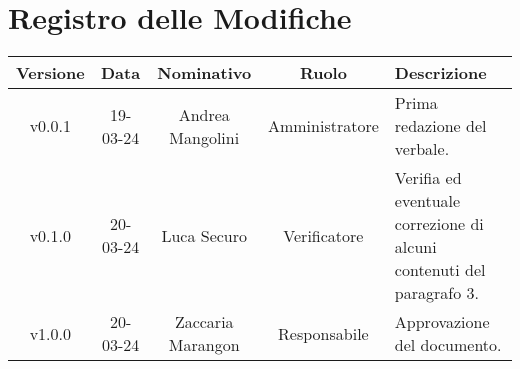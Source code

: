 \section*{\Large Registro delle Modifiche}
    \begin{table}[h]
        \centering
        \renewcommand\tabularxcolumn[1]{m{#1}} %
        \renewcommand{\arraystretch}{1.5}
        \begin{tabularx}{0.98\textwidth}
            {c|c|c|c|>{\centering\arraybackslash}X}
            \rowcolor{black}
            \textbf{\color{white} Versione} & \textbf{\color{white} Data} & \textbf{\color{white} Nominativo} & \textbf{\color{white} Ruolo} & \textbf{\color{white} Descrizione} \\ 
            \hline

            v0.0.1 & 19-03-24 & Andrea Mangolini & Amministratore & Prima redazione del verbale.\\
            v0.1.0 & 20-03-24 & Luca Securo & Verificatore & Verifia ed eventuale correzione di alcuni contenuti del paragrafo 3.\\
            v1.0.0 & 20-03-24 & Zaccaria Marangon & Responsabile & Approvazione del documento.\\
            \hline
        \end{tabularx}
    \end{table}